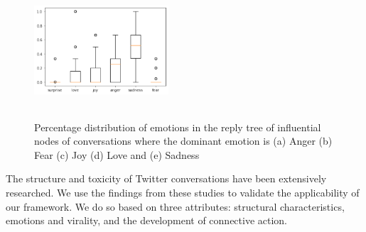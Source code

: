 \documentclass[acmtog]{acmart}
\begin{document}
\begin{figure}[h]
\begin{minipage}{.33\textwidth}
  \end{minipage}%
  \begin{minipage}{.33\textwidth}
    \centering
    \includegraphics[width=5cm,height=5cm,keepaspectratio]{sad_wie.pdf}
  \end{minipage}
  
  \caption{Percentage distribution of emotions in the reply tree of influential nodes of conversations where the dominant emotion is (a) Anger (b) Fear (c) Joy (d) Love and (e) Sadness}
  \label{SampleConv}
  \end{figure}
The structure and toxicity of Twitter conversations have been extensively researched. We use the findings from these studies to validate the applicability of our framework. We do so based on three attributes: structural characteristics, emotions and virality, and the development of connective action.
\end{document}

